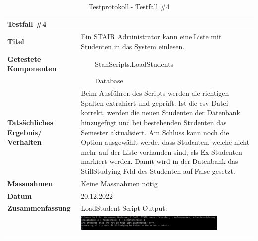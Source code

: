 \documentclass[a4paper, table]{article}
\newcommand{\tabitem}{~~\llap{\textbullet}~~}
\begin{document}
\begin{longtable}[h]{|p{9em}|p{31em}|}
    \hline
    \multicolumn{2}{|l|}{\textbf{Testfall \#4}} \\
    \hline
    \textbf{Titel} & Ein STAIR Administrator kann eine Liste mit Studenten in das System einlesen. \\
    \hline
    \textbf{Getestete Komponenten} & 
        \tabitem StanScripts.LoadStudents \\*
     &  \tabitem Database \\
    \hline
    \textbf{Tatsächliches Ergebnis/ Verhalten} &  
        Beim Ausführen des Scripts werden die richtigen Spalten extrahiert und geprüft. 
        Ist die csv-Datei korrekt, werden die neuen Studenten der Datenbank hinzugefügt und bei bestehenden Studenten das Semester aktualisiert.
        Am Schluss kann noch die Option ausgewählt werde, dass Studenten, welche nicht mehr auf der Liste vorhanden sind, als Ex-Studenten markiert werden. 
        Damit wird in der Datenbank das StillStudying Feld des Studenten auf False gesetzt. \\
    \hline
    \textbf{Massnahmen} & Keine Massnahmen nötig \\
    \hline
    \textbf{Datum} & 20.12.2022\\
    \hline
    \textbf{Zusammenfassung} & LoadStudent Script Output: \\*
     & \includegraphics[width=0.8\textwidth]{img/Tests/4_Test_LoadStudents.png} \\
    \hline
    \caption{Testprotokoll - Testfall \#4}
\end{longtable}
\end{document}
